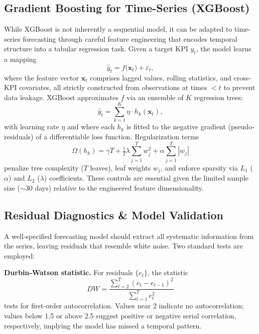 \subsection{Gradient Boosting for Time-Series (XGBoost)}

While XGBoost is not inherently a sequential model, it can be adapted to time-series forecasting through careful feature engineering that encodes temporal structure into a tabular regression task. Given a target KPI $y_t$, the model learns a mapping
\begin{equation}
\hat{y}_t = f\bigl(\mathbf{x}_t\bigr) + \varepsilon_t,
\end{equation}
where the feature vector $\mathbf{x}_t$ comprises lagged values, rolling statistics, and cross-KPI covariates, all strictly constructed from observations at times $< t$ to prevent data leakage. XGBoost approximates $f$ via an ensemble of $K$ regression trees:
\begin{equation}
\hat{y}_t = \sum_{k=1}^{K} \eta \cdot h_k(\mathbf{x}_t),
\end{equation}
with learning rate $\eta$ and where each $h_k$ is fitted to the negative gradient (pseudo-residuals) of a differentiable loss function. Regularization terms
\begin{equation}
\Omega(h_k) = \gamma T + \tfrac{1}{2}\lambda \sum_{j=1}^{T} w_j^2 + \alpha \sum_{j=1}^{T} |w_j|
\end{equation}
penalize tree complexity ($T$ leaves), leaf weights $w_j$, and enforce sparsity via $L_1$ ($\alpha$) and $L_2$ ($\lambda$) coefficients. These controls are essential given the limited sample size ($\sim$30 days) relative to the engineered feature dimensionality.

\subsection{Residual Diagnostics \& Model Validation}

A well-specified forecasting model should extract all systematic information from the series, leaving residuals that resemble white noise. Two standard tests are employed:

\textbf{Durbin-Watson statistic.} For residuals $\{e_t\}$, the statistic
\begin{equation}
DW = \frac{\sum_{t=2}^{T}(e_t - e_{t-1})^2}{\sum_{t=1}^{T}e_t^2}
\end{equation}
tests for first-order autocorrelation. Values near 2 indicate no autocorrelation; values below 1.5 or above 2.5 suggest positive or negative serial correlation, respectively, implying the model has missed a temporal pattern.

